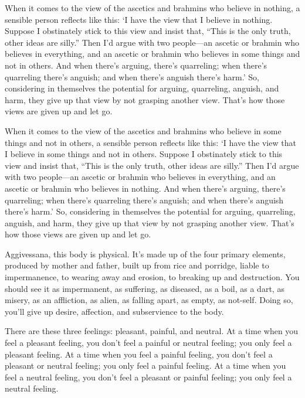 \documentclass[12pt,openany]{book}%
\begin{document}
When it comes to the view of the ascetics and brahmins who believe in nothing, a sensible person reflects like this: ‘I have the view that I believe in nothing. Suppose I obstinately stick to this view and insist that, “This is the only truth, other ideas are silly.” Then I’d argue with two people—an ascetic or brahmin who believes in everything, and an ascetic or brahmin who believes in some things and not in others. And when there’s arguing, there’s quarreling; when there’s quarreling there’s anguish; and when there’s anguish there’s harm.’ So, considering in themselves the potential for arguing, quarreling, anguish, and harm, they give up that view by not grasping another view. That’s how those views are given up and let go. 

When it comes to the view of the ascetics and brahmins who believe in some things and not in others, a sensible person reflects like this: ‘I have the view that I believe in some things and not in others. Suppose I obstinately stick to this view and insist that, “This is the only truth, other ideas are silly.” Then I’d argue with two people—an ascetic or brahmin who believes in everything, and an ascetic or brahmin who believes in nothing. And when there’s arguing, there’s quarreling; when there’s quarreling there’s anguish; and when there’s anguish there’s harm.’ So, considering in themselves the potential for arguing, quarreling, anguish, and harm, they give up that view by not grasping another view. That’s how those views are given up and let go. 

Aggivessana, this body is physical. It’s made up of the four primary elements, produced by mother and father, built up from rice and porridge, liable to impermanence, to wearing away and erosion, to breaking up and destruction. You should see it as impermanent, as suffering, as diseased, as a boil, as a dart, as misery, as an affliction, as alien, as falling apart, as empty, as not-self. Doing so, you’ll give up desire, affection, and subservience to the body. 

There are these three feelings: pleasant, painful, and neutral. At a time when you feel a pleasant feeling, you don’t feel a painful or neutral feeling; you only feel a pleasant feeling. At a time when you feel a painful feeling, you don’t feel a pleasant or neutral feeling; you only feel a painful feeling. At a time when you feel a neutral feeling, you don’t feel a pleasant or painful feeling; you only feel a neutral feeling. 
\end{document}

